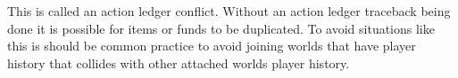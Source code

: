 \documentclass[runningheads,a4paper]{llncs}
\begin{document}
This is called an action ledger conflict. Without an action ledger traceback being done it is possible for items or funds to be duplicated. To avoid situations like this is should be common practice to avoid joining worlds that have player history that collides with other attached worlds player history.
\end{document}

